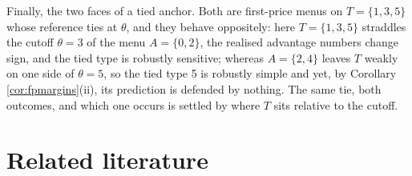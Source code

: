 \documentclass[12pt]{article}
\theoremstyle{definition}
\begin{document}
Finally, the two faces of a tied anchor. Both are first-price menus on $T = \{1,3,5\}$ whose reference ties at $\theta$, and they behave oppositely: here $T = \{1,3,5\}$ straddles the cutoff $\theta = 3$ of the menu $A = \{0,2\}$, the realised advantage numbers change sign, and the tied type is robustly sensitive; whereas $A = \{2,4\}$ leaves $T$ weakly on one side of $\theta = 5$, so the tied type 5 is robustly simple and yet, by Corollary \ref{cor:fpmargins}(ii), its prediction is defended by nothing. The same tie, both outcomes, and which one occurs is settled by where $T$ sits relative to the cutoff.

\section{Related literature}\label{sec:literature}
\end{document}
